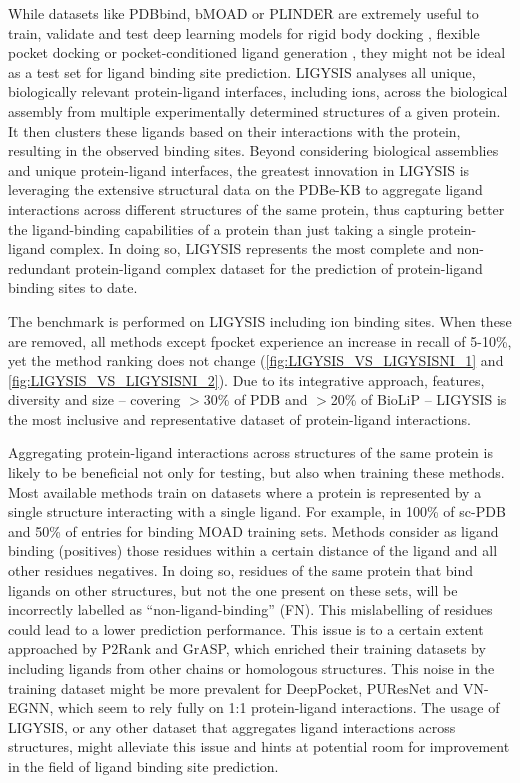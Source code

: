 While datasets like PDBbind, bMOAD or PLINDER \cite{DURAIRAJ_2024_PLINDER} are extremely useful to train, validate and test deep learning models for rigid body docking \cite{STARK_2022_EQUIBIND}, flexible pocket docking \cite{QIAO_2024_DGN} or pocket-conditioned ligand generation \cite{SCHNEUING_2024_DIFFUSION}, they might not be ideal as a test set for ligand binding site prediction. LIGYSIS analyses all unique, biologically relevant protein-ligand interfaces, including ions, across the biological assembly from multiple experimentally determined structures of a given protein. It then clusters these ligands based on their interactions with the protein, resulting in the observed binding sites. Beyond considering biological assemblies and unique protein-ligand interfaces, the greatest innovation in LIGYSIS is leveraging the extensive structural data on the PDBe-KB to aggregate ligand interactions across different structures of the same protein, thus capturing better the ligand-binding capabilities of a protein than just taking a single protein-ligand complex. In doing so, LIGYSIS represents the most complete and non-redundant protein-ligand complex dataset for the prediction of protein-ligand binding sites to date.

The benchmark is performed on LIGYSIS including ion binding sites. When these are removed, all methods except fpocket experience an increase in recall of 5-10\%, yet the method ranking does not change (\autoref{fig:LIGYSIS_VS_LIGYSISNI_1} and \autoref{fig:LIGYSIS_VS_LIGYSISNI_2}). Due to its integrative approach, features, diversity and size -- covering $>$30\% of PDB and $>$20\% of BioLiP -- LIGYSIS is the most inclusive and representative dataset of protein-ligand interactions.

Aggregating protein-ligand interactions across structures of the same protein is likely to be beneficial not only for testing, but also when training these methods. Most available methods train on datasets where a protein is represented by a single structure interacting with a single ligand. For example, in 100\% of sc-PDB and 50\% of entries for binding MOAD training sets. Methods consider as ligand binding (positives) those residues within a certain distance of the ligand and all other residues negatives. In doing so, residues of the same protein that bind ligands on other structures, but not the one present on these sets, will be incorrectly labelled as ``non-ligand-binding'' (FN). This mislabelling of residues could lead to a lower prediction performance. This issue is to a certain extent approached by P2Rank and GrASP, which enriched their training datasets by including ligands from other chains or homologous structures. This noise in the training dataset might be more prevalent for DeepPocket, PUResNet and VN-EGNN, which seem to rely fully on 1:1 protein-ligand interactions. The usage of LIGYSIS, or any other dataset that aggregates ligand interactions across structures, might alleviate this issue and hints at potential room for improvement in the field of ligand binding site prediction.

